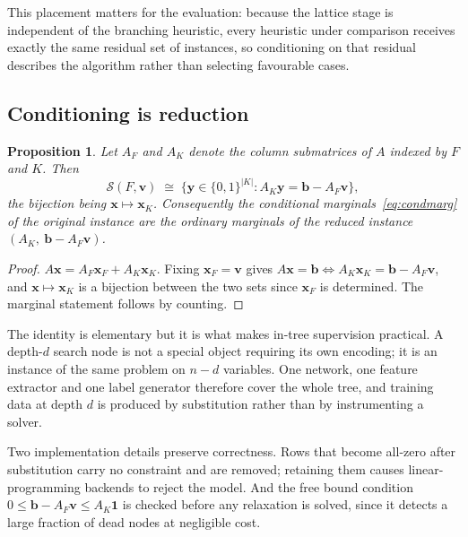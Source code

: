 \documentclass[final,5p,times,twocolumn]{elsarticle}
\newtheorem{proposition}{Proposition}
\newcommand{\SOL}{\mathcal{S}}
\begin{document}
This placement matters for the evaluation: because the lattice stage is independent of the branching heuristic, every heuristic under comparison receives exactly the same residual set of instances, so conditioning on that residual describes the algorithm rather than selecting favourable cases.

\subsection{Conditioning is reduction}
\label{sec:method-reduce}

\begin{proposition}
\label{prop:reduce}
Let $A_F$ and $A_K$ denote the column submatrices of $A$ indexed by $F$ and $K$. Then
\begin{equation}
\SOL(F,\mathbf{v}) \;\cong\; \{\mathbf{y}\in\{0,1\}^{|K|} : A_K\mathbf{y} = \mathbf{b} - A_F\mathbf{v}\},
\label{eq:reduce}
\end{equation}
the bijection being $\mathbf{x}\mapsto\mathbf{x}_K$. Consequently the conditional marginals~\eqref{eq:condmarg} of the original instance are the ordinary marginals of the reduced instance $(A_K,\ \mathbf{b}-A_F\mathbf{v})$.
\end{proposition}

\begin{proof}
$A\mathbf{x} = A_F\mathbf{x}_F + A_K\mathbf{x}_K$. Fixing $\mathbf{x}_F=\mathbf{v}$ gives $A\mathbf{x}=\mathbf{b} \iff A_K\mathbf{x}_K = \mathbf{b}-A_F\mathbf{v}$, and $\mathbf{x}\mapsto\mathbf{x}_K$ is a bijection between the two sets since $\mathbf{x}_F$ is determined. The marginal statement follows by counting.
\end{proof}

The identity is elementary but it is what makes in-tree supervision practical. A depth-$d$ search node is not a special object requiring its own encoding; it is an instance of the same problem on $n-d$ variables. One network, one feature extractor and one label generator therefore cover the whole tree, and training data at depth $d$ is produced by substitution rather than by instrumenting a solver.

Two implementation details preserve correctness. Rows that become all-zero after substitution carry no constraint and are removed; retaining them causes linear-programming backends to reject the model. And the free bound condition $0\le \mathbf{b}-A_F\mathbf{v}\le A_K\mathbf{1}$ is checked before any relaxation is solved, since it detects a large fraction of dead nodes at negligible cost.
\end{document}

